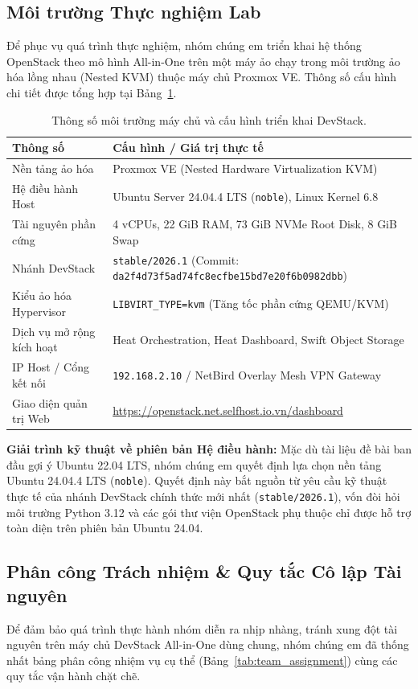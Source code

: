 \subsection{Môi trường Thực nghiệm Lab}
Để phục vụ quá trình thực nghiệm, nhóm chúng em triển khai hệ thống OpenStack theo mô hình All-in-One trên một máy ảo chạy trong môi trường ảo hóa lồng nhau (Nested KVM) thuộc máy chủ Proxmox VE. Thông số cấu hình chi tiết được tổng hợp tại Bảng~\ref{tab:env_specs}.

\begin{table}[H]
\centering
\small
\begin{tabular}{|l|p{9.2cm}|}
\hline
\textbf{Thông số} & \textbf{Cấu hình / Giá trị thực tế} \\ \hline
Nền tảng ảo hóa & Proxmox VE (Nested Hardware Virtualization KVM)~\cite{kvm_paper} \\ \hline
Hệ điều hành Host & Ubuntu Server 24.04.4 LTS (\texttt{noble}), Linux Kernel 6.8 \\ \hline
Tài nguyên phần cứng & 4 vCPUs, 22 GiB RAM, 73 GiB NVMe Root Disk, 8 GiB Swap \\ \hline
Nhánh DevStack & \nolinkurl{stable/2026.1} (Commit: \nolinkurl{da2f4d73f5ad74fc8ecfbe15bd7e20f6b0982dbb}) \\ \hline
Kiểu ảo hóa Hypervisor & \texttt{LIBVIRT\_TYPE=kvm} (Tăng tốc phần cứng QEMU/KVM) \\ \hline
Dịch vụ mở rộng kích hoạt & Heat Orchestration, Heat Dashboard, Swift Object Storage \\ \hline
IP Host / Cổng kết nối & \texttt{192.168.2.10} / NetBird Overlay Mesh VPN Gateway \\ \hline
Giao diện quản trị Web & \url{https://openstack.net.selfhost.io.vn/dashboard} \\ \hline
\end{tabular}
\caption{Thông số môi trường máy chủ và cấu hình triển khai DevStack.}
\label{tab:env_specs}
\end{table}

\noindent \textbf{Giải trình kỹ thuật về phiên bản Hệ điều hành:} Mặc dù tài liệu đề bài ban đầu gợi ý Ubuntu 22.04 LTS, nhóm chúng em quyết định lựa chọn nền tảng Ubuntu 24.04.4 LTS (\texttt{noble}). Quyết định này bắt nguồn từ yêu cầu kỹ thuật thực tế của nhánh DevStack chính thức mới nhất (\nolinkurl{stable/2026.1}), vốn đòi hỏi môi trường Python 3.12 và các gói thư viện OpenStack phụ thuộc chỉ được hỗ trợ toàn diện trên phiên bản Ubuntu 24.04.

\subsection{Phân công Trách nhiệm \& Quy tắc Cô lập Tài nguyên}
Để đảm bảo quá trình thực hành nhóm diễn ra nhịp nhàng, tránh xung đột tài nguyên trên máy chủ DevStack All-in-One dùng chung, nhóm chúng em đã thống nhất bảng phân công nhiệm vụ cụ thể (Bảng~\ref{tab:team_assignment}) cùng các quy tắc vận hành chặt chẽ.

